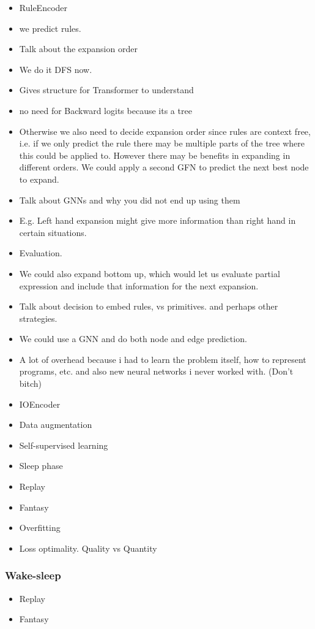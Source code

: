 \begin{itemize}
	\item RuleEncoder
    \item we predict rules.
    \item Talk about the expansion order
    \item We do it DFS now.
    \item Gives structure for Transformer to understand
    \item no need for Backward logits because its a tree
    \item Otherwise we also need to decide expansion order since rules are context free, i.e. if we only predict the rule there may be multiple parts of the tree where this could be applied to. However there may be benefits in expanding in different orders. We could apply a second GFN to predict the next best node to expand.
    \item Talk about GNNs and why you did not end up using them 
    \item E.g. Left hand expansion might give more information than right hand in certain situations. 
    \item Evaluation. 
    \item We could also expand bottom up, which would let us evaluate partial expression and include that information for the next expansion.
    \item Talk about decision to embed rules, vs primitives. and perhaps other strategies.
    \item We could use a GNN and do both node and edge prediction. 
    \item A lot of overhead because i had to learn the problem itself, how to represent programs, etc. and also new neural networks i never worked with. (Don't bitch)
    \item IOEncoder
    \item Data augmentation
    \item Self-supervised learning
    \item Sleep phase
    \item Replay 
    \item Fantasy
    \item Overfitting
    \item Loss optimality. Quality vs Quantity
\end{itemize}

\subsubsection{Wake-sleep}
\begin{itemize}
    \item Replay
    \item Fantasy
\end{itemize}

